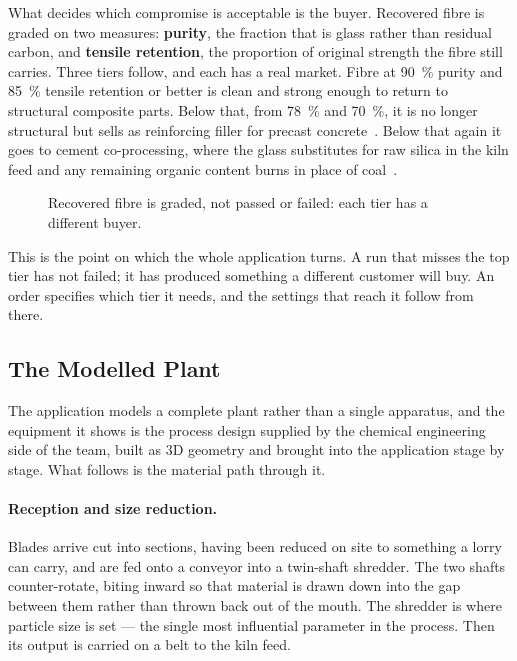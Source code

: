 What decides which compromise is acceptable is the buyer. Recovered fibre is graded on two measures: \textbf{purity}, the fraction that is glass rather than residual carbon, and \textbf{tensile retention}, the proportion of original strength the fibre still carries. Three tiers follow, and each has a real market. Fibre at \SI{90}{\%} purity and \SI{85}{\%} tensile retention or better is clean and strong enough to return to structural composite parts. Below that, from \SI{78}{\%} and \SI{70}{\%}, it is no longer structural but sells as reinforcing filler for precast concrete~\cite{beauson2025}. Below that again it goes to cement co-processing, where the glass substitutes for raw silica in the kiln feed and any remaining organic content burns in place of coal~\cite{envecon}.

\begin{figure}[htbp]
  \centering
  \resizebox{0.95\textwidth}{!}{}
  \caption{Recovered fibre is graded, not passed or failed: each tier has a
           different buyer.}
  \label{fig:grades}
\end{figure}

This is the point on which the whole application turns. A run that misses the top tier has not failed; it has produced something a different customer will buy. An order specifies which tier it needs, and the settings that reach it follow from there.

\subsection{The Modelled Plant}

The application models a complete plant rather than a single apparatus, and the equipment it shows is the process design supplied by the chemical
engineering side of the team, built as 3D geometry and brought into the
application stage by stage. What follows is the material path through it.

\paragraph{Reception and size reduction.}
Blades arrive cut into sections, having been reduced on site to something a lorry can carry, and are fed onto a conveyor into a twin-shaft shredder. The two shafts counter-rotate, biting inward so that material is drawn down into the gap between them rather than thrown back out of the mouth. The shredder is where particle size is set --- the single most influential parameter in the process. Then its output is carried on a belt to the kiln feed.

